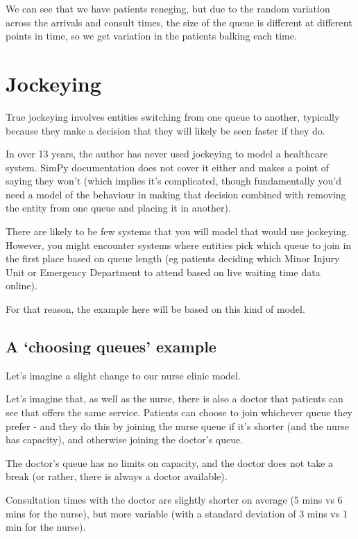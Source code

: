 \documentclass[
  letterpaper,
  DIV=11,
  numbers=noendperiod]{scrreprt}
\begin{document}
We can see that we have patients reneging, but due to the random
variation across the arrivals and consult times, the size of the queue
is different at different points in time, so we get variation in the
patients balking each time.

\section{Jockeying}\label{jockeying}

True jockeying involves entities switching from one queue to another,
typically because they make a decision that they will likely be seen
faster if they do.

In over 13 years, the author has never used jockeying to model a
healthcare system. SimPy documentation does not cover it either and
makes a point of saying they won't (which implies it's complicated,
though fundamentally you'd need a model of the behaviour in making that
decision combined with removing the entity from one queue and placing it
in another).

There are likely to be few systems that you will model that would use
jockeying. However, you might encounter systems where entities pick
which queue to join in the first place based on queue length (eg
patients deciding which Minor Injury Unit or Emergency Department to
attend based on live waiting time data online).

For that reason, the example here will be based on this kind of model.

\subsection{A `choosing queues'
example}\label{a-choosing-queues-example}

Let's imagine a slight change to our nurse clinic model.

Let's imagine that, as well as the nurse, there is also a doctor that
patients can see that offers the same service. Patients can choose to
join whichever queue they prefer - and they do this by joining the nurse
queue if it's shorter (and the nurse has capacity), and otherwise
joining the doctor's queue.

The doctor's queue has no limits on capacity, and the doctor does not
take a break (or rather, there is always a doctor available).

Consultation times with the doctor are slightly shorter on average (5
mins vs 6 mins for the nurse), but more variable (with a standard
deviation of 3 mins vs 1 min for the nurse).
\end{document}

